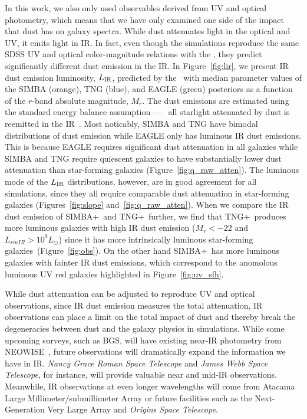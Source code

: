 In this work, we also only used observables derived from UV and optical
photometry, which means that we have only examined one side of the impact
that dust has on galaxy spectra.
While dust attenuates light in the optical and UV, it emits light in
IR. In fact, even though the simulations reproduce the same SDSS UV and
optical color-magnitude relations with the \eda, they predict significantly 
different dust emission in the IR. 
In Figure~\ref{fig:lir}, we present IR dust emission luminosity, $L_{\rm
IR}$, predicted by the \eda~with median parameter values of the SIMBA 
(orange), TNG (blue), and EAGLE (green) posteriors as a function of the
$r$-band absolute magnitude, $M_r$.
The dust emissions are estimated using the standard energy balance assumption
--- \ie~all starlight attenuated by dust is reemitted in the IR~\citep{dacunha2008}. 
Most noticably, SIMBA and TNG have bimodal distributions of dust emission
while EAGLE only has luminous IR dust emissions. 
This is because EAGLE requires significant dust attenuation in all
galaxies while SIMBA and TNG require quiescent galaxies to have
substantially lower dust attenuation than star-forming galaxies
(Figure~\ref{fig:q_raw_atten}). 
The luminous mode of the $L_{\rm IR}$ distributions, however, are in good
agreement for all simulations, since they all require comparable dust
attenuation in star-forming galaxies
(Figures~\ref{fig:slope} and~\ref{fig:q_raw_atten}). 
When we compare the IR dust emission of SIMBA+\eda~and TNG+\eda~further, we
find that TNG+\eda~produces more luminous galaxies with high IR dust
emission ($M_r < -22$ and $L_{rm IR} > 10^9L_\odot$) since it has more
intrinsically luminous star-forming galaxies~(Figure~\ref{fig:obs}).
On the other hand SIMBA+\eda~has more luminous galaxies with fainter IR
dust emissions, which correspond to the anomolous luminous UV red galaxies
highlighted in Figure~\ref{fig:uv_sfh}.

While dust attenuation can be adjusted to reproduce UV and optical
observations, since IR dust emission measures the total attenuation, IR
observations can place a limit on the total impact of dust and thereby
break the degeneracies between dust and the galaxy physics in simulations.
While some upcoming surveys, such as BGS, will have existing near-IR
photometry from NEOWISE~\citep{meisner2018}, future observations will
dramatically expand the information we have in IR.
\emph{Nancy Grace Roman Space Telescope} and \emph{James Webb Space
Telescope}, for instance, will provide valuable near and
mid-IR observations. 
Meanwhile, IR observations at even longer wavelengths will come from
Atacama Large Millimeter/submillimeter Array or future facilities
such as the Next-Generation Very Large Array and \emph{Origins Space Telescope}.


